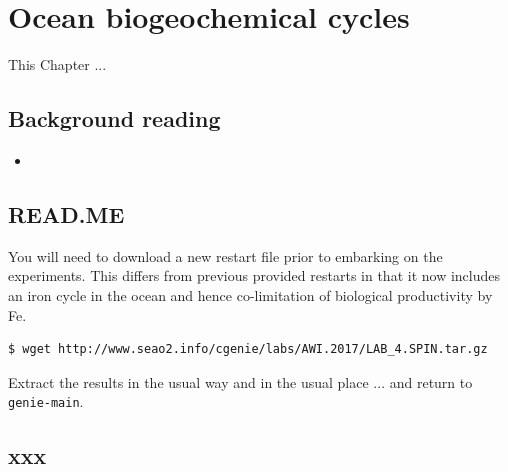 \documentclass[11pt,fleqn]{book} %
\begin{document}
\cleardoublepage


\chapter{Ocean biogeochemical cycles}

\hfill \break

\vspace{24mm}

\noindent This Chapter ...

\section*{Background reading}
\begin{itemize}
\item 
\end{itemize}


\newpage


\section*{READ.ME}

You will need to download a new restart file prior to embarking on the experiments. This differs from previous provided restarts in that it now includes an iron cycle in the ocean and hence co-limitation of biological productivity by Fe.

\begin{verbatim}
$ wget http://www.seao2.info/cgenie/labs/AWI.2017/LAB_4.SPIN.tar.gz
\end{verbatim}

Extract the results in the usual way and in the usual place ... and return to \texttt{genie-main}.


\newpage


\section{xxx}



\end{document}

